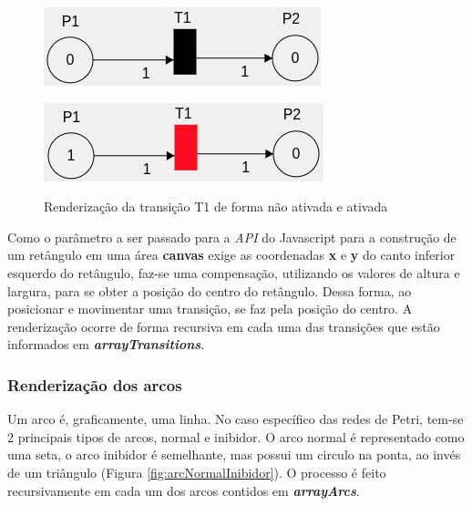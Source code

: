 \documentclass[
	12pt,				%
	openright,			%
	oneside,			%
	a4paper,			%
	english,			%
	brazil				%
	]{abntex2}
\theoremstyle{doispontos}
\begin{document}
\begin{figure}[ht]
	\label{fig:renderTransition}
	\centering
	\begin{minipage}{0.5\textwidth}
		\centering
		\includegraphics[scale=1]{figuras/transitionEnableFalse.png}
		\label{fig:renderTransitionEnableFalse}
	\end{minipage}
	\hfill
	\begin{minipage}{0.5\textwidth}
		\centering
		\includegraphics[scale=1]{figuras/transitionEnableTrue.png}
		\label{fig:renderTransitionEnableTrue}
	\end{minipage}
	\caption{Renderização da transição T1 de forma não ativada e ativada}
	\label{fig:renderTransitionEnable}
\end{figure}

Como o parâmetro a ser passado para a \textit{API} do Javascript para a construção de um retângulo em uma área \textbf{canvas} exige as coordenadas \textbf{x} e \textbf{y} do canto inferior esquerdo do retângulo, faz-se uma compensação, utilizando os valores de altura e largura, para se obter a posição do centro do retângulo. Dessa forma, ao posicionar e movimentar uma transição, se faz pela posição do centro.  A renderização ocorre de forma recursiva em cada uma das transições que estão informados em \textbf{\textit{arrayTransitions}}.

\subsubsection{Renderização dos arcos}

Um arco é, graficamente, uma linha. No caso específico das redes de Petri, tem-se 2 principais tipos de arcos, normal e inibidor. O arco normal é representado como uma seta, o arco inibidor é semelhante, mas possui um circulo na ponta, ao invés de um triângulo (Figura \ref{fig:arcNormalInibidor}). O processo é feito recursivamente em cada um dos arcos contidos em \textbf{\textit{arrayArcs}}.
\end{document}
